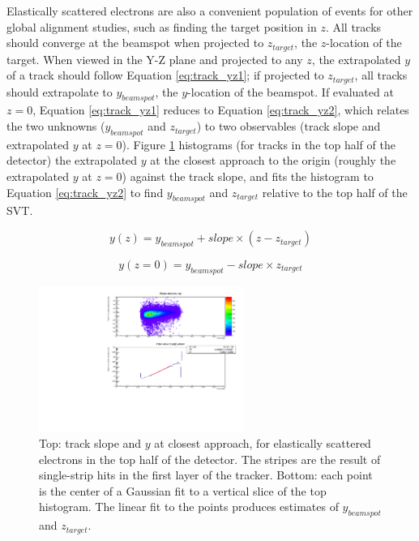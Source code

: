 Elastically scattered electrons are also a convenient population of events for other global alignment studies, such as finding the target position in $z$.
All tracks should converge at the beamspot when projected to $z_{target}$, the $z$-location of the target.
When viewed in the Y-Z plane and projected to any $z$, the extrapolated $y$ of a track should follow Equation \ref{eq:track_yz1}; if projected to $z_{target}$, all tracks should extrapolate to $y_{beamspot}$, the $y$-location of the beamspot.
If evaluated at $z=0$, Equation \ref{eq:track_yz1} reduces to Equation \ref{eq:track_yz2}, which relates the two unknowns ($y_{beamspot}$ and $z_{target}$) to two observables (track slope and extrapolated $y$ at $z=0$).
Figure \ref{fig:feeangles} histograms (for tracks in the top half of the detector) the extrapolated $y$ at the closest approach to the origin (roughly the extrapolated $y$ at $z=0$) against the track slope, and fits the histogram to Equation \ref{eq:track_yz2} to find $y_{beamspot}$ and $z_{target}$ relative to the top half of the SVT.

\begin{equation}
    y(z)=y_{beamspot} + {slope}\times(z-z_{target})
    \label{eq:track_yz1}
\end{equation}

\begin{equation}
    y(z=0)=y_{beamspot} - {slope}\times z_{target}
    \label{eq:track_yz2}
\end{equation}

\begin{figure}[ht]
\begin{center}
    \includegraphics[width=0.6\textwidth,page=1,angle=-90]{recon/figs/fee_angles}
\end{center}
    \caption{
        Top: track slope and $y$ at closest approach, for elastically scattered electrons in the top half of the detector.
        The stripes are the result of single-strip hits in the first layer of the tracker.
        Bottom: each point is the center of a Gaussian fit to a vertical slice of the top histogram.
        The linear fit to the points produces estimates of $y_{beamspot}$ and $z_{target}$.
    }
    \label{fig:feeangles}
\end{figure}


